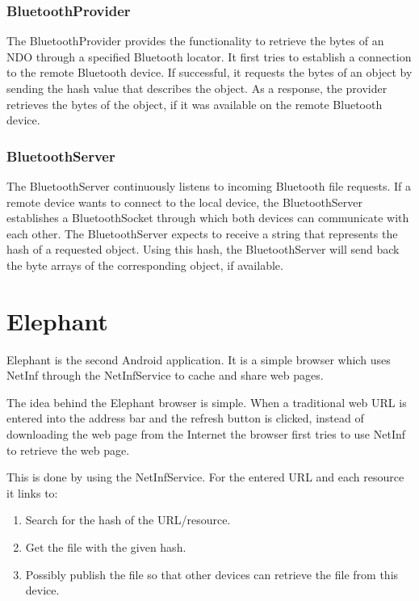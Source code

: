 \subsubsection{BluetoothProvider}
\label{sec:BluetoothProvider}
The BluetoothProvider provides the functionality to retrieve the bytes of an NDO through a specified Bluetooth locator. It first tries to establish a connection to the remote
Bluetooth device. If successful, it requests the bytes of an object by sending the hash value
that describes the object. As a response, the provider retrieves the bytes of the object, if
it was available on the remote Bluetooth device.

\subsubsection{BluetoothServer}
The BluetoothServer continuously listens to incoming Bluetooth file requests. 
If a remote device wants to connect to the local device, the BluetoothServer establishes
a BluetoothSocket through which both devices can communicate with each other.
The BluetoothServer expects to receive a string that represents the hash
of a requested object. Using this hash, the BluetoothServer will send back
the byte arrays of the corresponding object, if available. 

\section{Elephant}
\label{sec:Elephant}

Elephant is the second Android application. It is a simple browser which uses NetInf through the NetInfService to cache and share web pages.

The idea behind the Elephant browser is simple. When a traditional web URL is entered into the address bar and the refresh button is clicked, instead of downloading the web page from the Internet the browser first tries to use NetInf to retrieve the web page.

This is done by using the NetInfService. For the entered URL and each resource it links to:
\begin{enumerate}
	\item Search for the hash of the URL/resource.
	\item Get the file with the given hash.
	\item Possibly publish the file so that other devices can retrieve the file from this device.
\end{enumerate}

